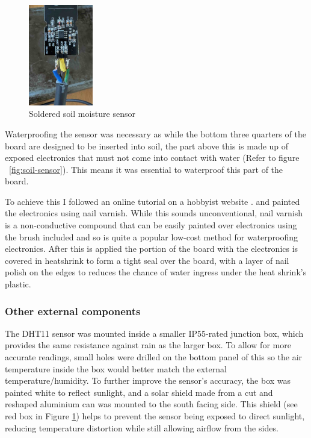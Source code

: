 \begin{figure}[H]
    \centering
    \includegraphics[width=0.25\textwidth]{contents/part-2/fig2/solder-soil.jpeg}
    \caption{Soldered soil moisture sensor}
    \label{fig:solder-soil}
\end{figure}

Waterproofing the sensor was necessary as while the bottom three quarters of the
board are designed to be inserted into soil, the part above this is made up of
exposed electronics that must not come into contact with water (Refer to figure
~\ref{fig:soil-sensor}). This means it was essential to waterproof this part of
the board.

To achieve this I followed an online tutorial on a hobbyist website
\cite{waterproof-sensor}. and painted the electronics using nail varnish. While
this sounds unconventional, nail varnish is a non-conductive compound that can
be easily painted over electronics using the brush included and so is quite a
popular low-cost method for waterproofing electronics. After this is applied the
portion of the board with the electronics is covered in heatshrink to form a
tight seal over the board, with a layer of nail polish on the edges to reduces
the chance of water ingress under the heat shrink's plastic.

\subsubsection{Other external components}

The DHT11 sensor was mounted inside a smaller IP55-rated junction box, which
provides the same resistance against rain as the larger box. To allow for more
accurate readings, small holes were drilled on the bottom panel of this so the
air temperature inside the box would better match the external
temperature/humidity. To further improve the sensor's accuracy, the box was
painted white to reflect sunlight, and a solar shield made from a cut and
reshaped aluminium can was mounted to the south facing side. This shield (see
red box in Figure \ref{fig:solder-soil}) helps to prevent the sensor being
exposed to direct sunlight, reducing temperature distortion while still allowing
airflow from the sides.

